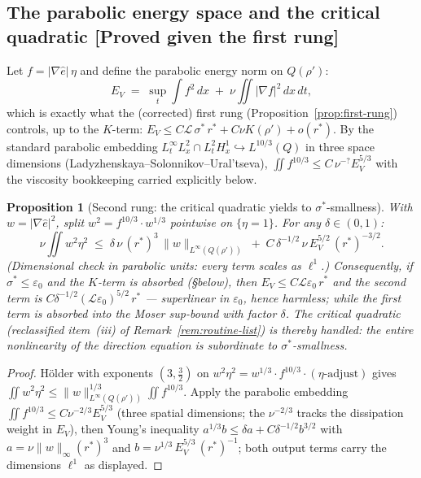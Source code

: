 \documentclass[11pt]{article}
\newtheorem{proposition}[theorem]{Proposition}
\theoremstyle{definition}
\theoremstyle{remark}
\begin{document}
\subsection{The parabolic energy space and the critical quadratic [Proved given the first rung]}

Let $f = |\nabla\hat{e}|\,\eta$ and define the parabolic energy norm on
$Q(\rho')$:
\[
  E_V \;=\; \sup_{t}\int f^2\,dx \;+\; \nu\iint |\nabla f|^2\,dx\,dt,
\]
which is exactly what the (corrected) first rung
(Proposition~\ref{prop:first-rung}) controls, up to the $K$-term:
$E_V \leq C\mathcal{L}\,\sigma^*\,r^* + C\nu K(\rho') + o(r^*)$. By the
standard parabolic embedding $L^\infty_t L^2_x \cap L^2_t H^1_x
\hookrightarrow L^{10/3}(Q)$ in three space dimensions
(Ladyzhenskaya--Solonnikov--Ural'tseva),
$\iint f^{10/3} \leq C\,\nu^{-?}E_V^{5/3}$ with the viscosity bookkeeping
carried explicitly below.

\begin{proposition}[Second rung: the critical quadratic yields to
  $\sigma^*$-smallness]\label{prop:second-rung}
  With $w = |\nabla\hat{e}|^2$, split $w^2 = f^{10/3}\cdot w^{1/3}$
  pointwise on $\{\eta = 1\}$. For any $\delta\in(0,1)$:
  \[
    \nu\iint w^2\eta^2
    \;\leq\;
    \delta\,\nu\,(r^*)^3\,\|w\|_{L^\infty(Q(\rho'))}
    \;+\; C\,\delta^{-1/2}\,\nu\,E_V^{5/2}\,(r^*)^{-3/2}.
  \]
  (Dimensional check in parabolic units: every term scales as $\ell^{1}$.)
  Consequently, if $\sigma^*\leq\varepsilon_0$ and the $K$-term is absorbed
  (\S below), then $E_V \leq C\mathcal{L}\varepsilon_0\,r^*$ and the second
  term is $C\delta^{-1/2}(\mathcal{L}\varepsilon_0)^{5/2}\,r^*$ ---
  superlinear in $\varepsilon_0$, hence harmless; while the first term is
  absorbed into the Moser sup-bound with factor $\delta$. The critical
  quadratic (reclassified item~(iii) of Remark~\ref{rem:routine-list}) is
  thereby handled: \emph{the entire nonlinearity of the direction equation
  is subordinate to $\sigma^*$-smallness}.
\end{proposition}
\begin{proof}
  H\"older with exponents $(3,\tfrac32)$ on
  $w^2\eta^2 = w^{1/3}\cdot f^{10/3}\cdot(\eta\text{-adjust})$ gives
  $\iint w^2\eta^2 \leq \|w\|_{L^\infty(Q(\rho'))}^{1/3}\iint f^{10/3}$.
  Apply the parabolic embedding
  $\iint f^{10/3}\leq C\nu^{-2/3}E_V^{5/3}$ (three spatial dimensions;
  the $\nu^{-2/3}$ tracks the dissipation weight in $E_V$), then Young's
  inequality $a^{1/3}b\leq\delta a + C\delta^{-1/2}b^{3/2}$ with
  $a = \nu\|w\|_\infty(r^*)^3$ and
  $b = \nu^{1/3}\,E_V^{5/3}\,(r^*)^{-1}$; both output terms carry the
  dimensions $\ell^1$ as displayed.
\end{proof}
\end{document}
